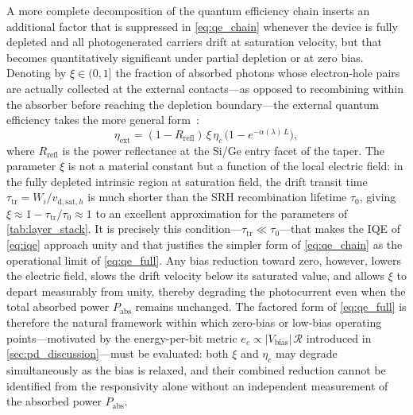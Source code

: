 A more complete decomposition of the quantum efficiency chain inserts an
additional factor that is suppressed in \cref{eq:qe_chain} whenever the device
is fully depleted and all photogenerated carriers drift at saturation velocity,
but that becomes quantitatively significant under partial depletion or at zero
bias. Denoting by $\xi\in(0,1]$ the fraction of absorbed photons whose
electron-hole pairs are actually collected at the external contacts—as opposed
to recombining within the absorber before reaching the depletion boundary—the
external quantum efficiency takes the more general form~\cite{Yan2024}:
\begin{equation}
    \eta_{\mathrm{ext}}
    = (1 - R_{\mathrm{refl}})\,\xi\,\eta_c\,
      \bigl(1 - e^{-\alpha(\lambda)\,L}\bigr),
    \label{eq:qe_full}
\end{equation}
where $R_{\mathrm{refl}}$ is the power reflectance at the Si/Ge entry facet of
the taper. The parameter $\xi$ is not a material constant but a function of
the local electric field: in the fully depleted intrinsic region at saturation
field, the drift transit time $\tau_{\mathrm{tr}} = W_i/v_{\mathrm{d,sat},h}$
is much shorter than the SRH recombination lifetime $\tau_0$, giving
$\xi \approx 1 - \tau_{\mathrm{tr}}/\tau_0 \approx 1$ to an excellent
approximation for the parameters of \cref{tab:layer_stack}. It is precisely
this condition—$\tau_{\mathrm{tr}} \ll \tau_0$—that makes the IQE of
\cref{eq:iqe} approach unity and that justifies the simpler form of
\cref{eq:qe_chain} as the operational limit of \cref{eq:qe_full}. Any bias
reduction toward zero, however, lowers the electric field, slows the drift
velocity below its saturated value, and allows $\xi$ to depart measurably from
unity, thereby degrading the photocurrent even when the total absorbed power
$P_{\mathrm{abs}}$ remains unchanged. The factored form of \cref{eq:qe_full}
is therefore the natural framework within which zero-bias or low-bias operating
points—motivated by the energy-per-bit metric $e_c \propto |V_{\mathrm{bias}}|
\,\mathcal{R}$ introduced in \cref{sec:pd_discussion}—must be evaluated: both
$\xi$ and $\eta_c$ may degrade simultaneously as the bias is relaxed, and their
combined reduction cannot be identified from the responsivity alone without an
independent measurement of the absorbed power $P_{\mathrm{abs}}$.



